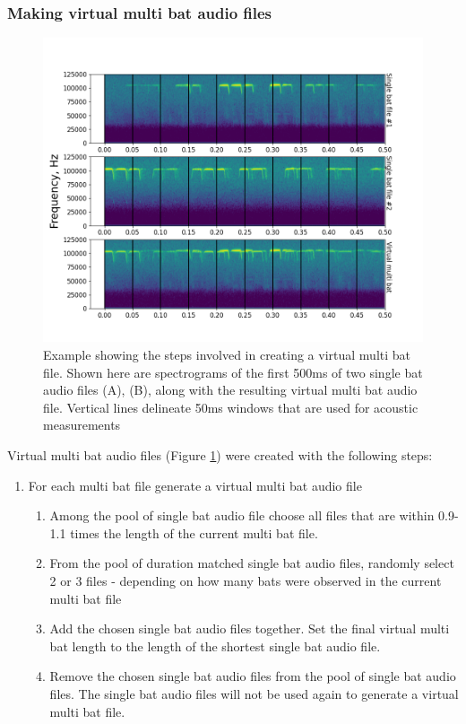 \documentclass[
]{book}
\providecommand{\tightlist}{%
  \setlength{\itemsep}{0pt}\setlength{\parskip}{0pt}}
\begin{document}
\hypertarget{virtualdetails}{%
\subsubsection{Making virtual multi bat audio files}\label{virtualdetails}}

\begin{figure}
\includegraphics[width=1\linewidth]{original_papers/hbc-paper/figures/figX_virtualmultibat} \caption{\label{fig:virtualmultibat} Example showing the steps involved in creating a virtual multi bat file. Shown here are spectrograms of the first 500ms of two single bat audio files (A), (B), along with the resulting virtual multi bat audio file. Vertical lines delineate 50ms windows that are used for acoustic measurements}\label{fig:virtualmultibat}
\end{figure}

Virtual multi bat audio files (Figure \ref{fig:virtualmultibat}) were created with the following steps:

\begin{enumerate}
\def\labelenumi{\arabic{enumi}.}
\tightlist
\item
  For each multi bat file generate a virtual multi bat audio file

  \begin{enumerate}
  \def\labelenumii{\arabic{enumii}.}
  \tightlist
  \item
    Among the pool of single bat audio file choose all files that are within 0.9-1.1 times the length of the current multi bat file.
  \item
    From the pool of duration matched single bat audio files, randomly select 2 or 3 files - depending on how many bats were observed in the current multi bat file
  \item
    Add the chosen single bat audio files together. Set the final virtual multi bat length to the length of the shortest single bat audio file.
  \item
    Remove the chosen single bat audio files from the pool of single bat audio files. The single bat audio files will not be used again to generate a virtual multi bat file.
  \end{enumerate}
\end{enumerate}
\end{document}
